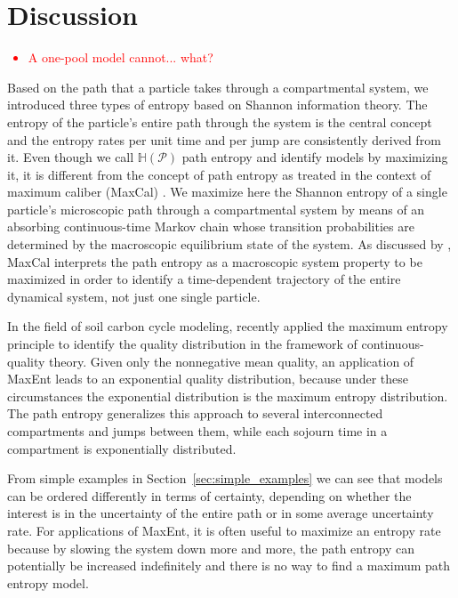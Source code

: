\documentclass[smallextended]{svjour3}
\renewcommand{\H}{\mathbb{H}}
\newcommand{\red}[1]{\textcolor{red}{#1}}
\begin{document}
\section{Discussion}
\red{
\begin{itemize}
  \item A one-pool model cannot... what?
  \end{itemize}
}
Based on the path that a particle takes through a compartmental system, we introduced three types of entropy based on Shannon information theory.
The entropy of the particle's entire path through the system is the central concept and the entropy rates per unit time and per jump are consistently derived from it.
Even though we call $\H(\mathcal{P})$ path entropy and identify models by maximizing it, it is different from the concept of path entropy as treated in the context of maximum caliber (MaxCal) \citep{jaynes1985macroscopic}.
We maximize here the Shannon entropy of a single particle's microscopic path through a compartmental system by means of an absorbing continuous-time Markov chain whose transition probabilities are determined by the macroscopic equilibrium state of the system.
As discussed by \citet{Presse2013RMP}, MaxCal interprets the path entropy as a macroscopic system property to be maximized in order to identify a time-dependent trajectory of the entire dynamical system, not just one single particle.

In the field of soil carbon cycle modeling, \citet{Agren2021BGC} recently applied the maximum entropy principle to identify the quality distribution in the framework of continuous-quality theory.
Given only the nonnegative mean quality, an application of MaxEnt leads to an exponential quality distribution, because under these circumstances the exponential distribution is the maximum entropy distribution.
The path entropy generalizes this approach to several interconnected compartments and jumps between them, while each sojourn time in a compartment is exponentially distributed.

From simple examples in Section~\ref{sec:simple_examples} we can see that models can be ordered differently in terms of certainty, depending on whether the interest is in the uncertainty of the entire path or in some average uncertainty rate.
For applications of MaxEnt, it is often useful to maximize an entropy rate because by slowing the system down more and more, the path entropy can potentially be increased indefinitely and there is no way to find a maximum path entropy model.
\end{document}
